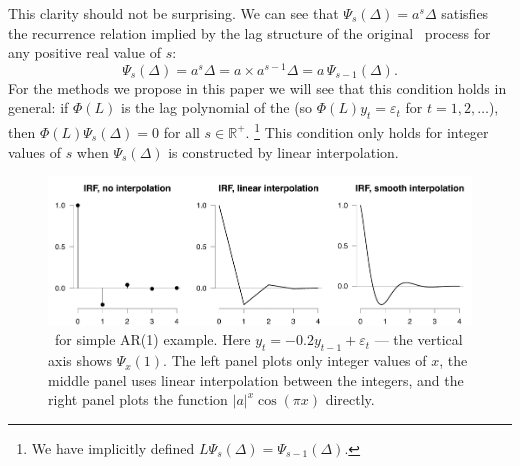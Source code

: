 \documentclass[12pt,fleqn]{article}
\newcommand{\vep}{\varepsilon}
\newcommand{\AR}{\allcaps{AR}}
\newcommand{\RR}{\mathbb{R}}
\begin{document}
This clarity should not be surprising. We can see that $\Psi_s(\Delta)
= a^s \Delta$ satisfies the recurrence relation implied by the lag
structure of the original \AR\ process for any positive real value of
$s$:
\begin{equation*}
  \Psi_s(\Delta) = a^s \Delta = a \times a^{s-1} \Delta = a \, \Psi_{s-1}(\Delta).
\end{equation*}
For the methods we propose in this paper we will see that this
condition holds in general: if $\Phi(L)$ is the lag polynomial of the
\VAR (so $\Phi(L)y_t = \vep_t$ for $t = 1, 2, \dots$), then $\Phi(L)
\Psi_s(\Delta) = 0$ for all $s \in \RR^+$.%
\footnote{We have implicitly defined $L \Psi_s(\Delta) =
  \Psi_{s-1}(\Delta)$.} %
This condition only holds for integer values of $s$ when
$\Psi_s(\Delta)$ is constructed by linear interpolation.

\begin{figure}[t]
  \centering
  \includegraphics{graphs/motivation2.pdf}
  \caption{\IRF\ for simple AR(1) example. Here $y_t = -0.2 y_{t-1} +
    \vep_t$ --- the vertical axis shows $\Psi_x(1)$. The left panel
    plots only integer values of $x$, the middle panel uses linear
    interpolation between the integers, and the right panel plots the
    function $|a|^x \cos(\pi x)$ directly.}
  \label{f0b}
\end{figure}
\end{document}
